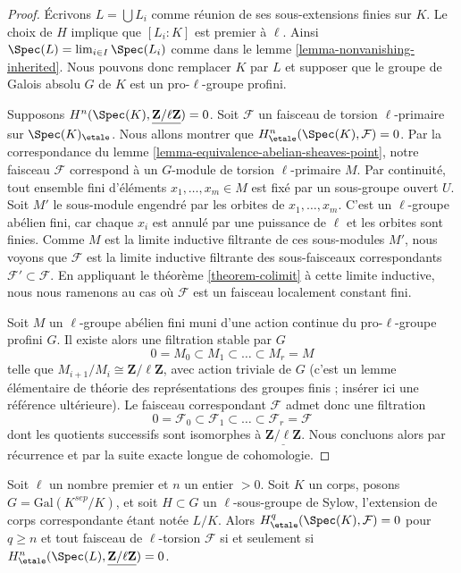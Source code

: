 \begin{proof}
\'Ecrivons $L = \bigcup L_i$ comme r\'eunion de ses sous-extensions finies sur $K$.
Le choix de $H$ implique que $[L_i : K]$ est premier \`a $\ell$.
Ainsi $\Spec(L) = \lim_{i \in I} \Spec(L_i)$ comme dans le
lemme \ref{lemma-nonvanishing-inherited}.
Nous pouvons donc remplacer $K$ par $L$ et supposer que
le groupe de Galois absolu $G$ de $K$ est un
pro-$\ell$-groupe profini.

\medskip\noindent
Supposons $H^n(\Spec(K), \underline{\mathbf{Z}/\ell\mathbf{Z}}) = 0$.
Soit $\mathcal{F}$ un faisceau de torsion $\ell$-primaire sur $\Spec(K)_\etale$.
Nous allons montrer que $H^n_\etale(\Spec(K), \mathcal{F}) = 0$.
Par la correspondance du
lemme \ref{lemma-equivalence-abelian-sheaves-point},
notre faisceau $\mathcal{F}$ correspond \`a un $G$-module de torsion
$\ell$-primaire $M$. Par continuit\'e, tout ensemble fini d'\'el\'ements $x_1, \ldots, x_m \in M$
est fix\'e par un sous-groupe ouvert $U$.
Soit $M'$ le sous-module engendr\'e par les orbites de $x_1, \ldots, x_m$.
C'est un $\ell$-groupe ab\'elien fini,
car chaque $x_i$ est annul\'e par une puissance de $\ell$
et les orbites sont finies. Comme $M$ est la limite inductive filtrante de
ces sous-modules $M'$, nous voyons que $\mathcal{F}$ est la limite
inductive filtrante des sous-faisceaux correspondants $\mathcal{F}' \subset \mathcal{F}$.
En appliquant le th\'eor\`eme \ref{theorem-colimit} \`a cette limite inductive, nous nous ramenons
au cas o\`u $\mathcal{F}$ est un faisceau localement constant fini.

\medskip\noindent
Soit $M$ un $\ell$-groupe ab\'elien fini muni d'une action continue
du pro-$\ell$-groupe profini $G$. Il existe alors une filtration
stable par $G$
$$
0 = M_0 \subset M_1 \subset \ldots \subset M_r = M
$$
telle que $M_{i + 1}/M_i \cong \mathbf{Z}/\ell \mathbf{Z}$, avec
action triviale de $G$ (c'est un lemme \'el\'ementaire de th\'eorie des repr\'esentations
des groupes finis ; ins\'erer ici une r\'ef\'erence ult\'erieure).
Le faisceau correspondant $\mathcal{F}$ admet donc une filtration
$$
0 = \mathcal{F}_0 \subset \mathcal{F}_1 \subset \ldots \subset
\mathcal{F}_r = \mathcal{F}
$$
dont les quotients successifs sont isomorphes \`a
$\underline{\mathbf{Z}/\ell \mathbf{Z}}$.
Nous concluons alors par r\'ecurrence et par la suite exacte longue de
cohomologie.
\end{proof}

\begin{lemma}
\label{lemma-reduce-to-l-group-higher}
Soit $\ell$ un nombre premier et $n$ un entier $> 0$.
Soit $K$ un corps, posons $G = \text{Gal}(K^{sep}/K)$, et soit
$H \subset G$ un $\ell$-sous-groupe de Sylow,
l'extension de corps correspondante \'etant not\'ee $L/K$.
Alors $H^q_\etale(\Spec(K),\mathcal{F}) = 0$ pour $q \geq n$ et tout
faisceau de $\ell$-torsion $\mathcal{F}$ si et seulement si
$H^n_\etale(\Spec(L), \underline{\mathbf{Z}/\ell\mathbf{Z}}) = 0$.
\end{lemma}

